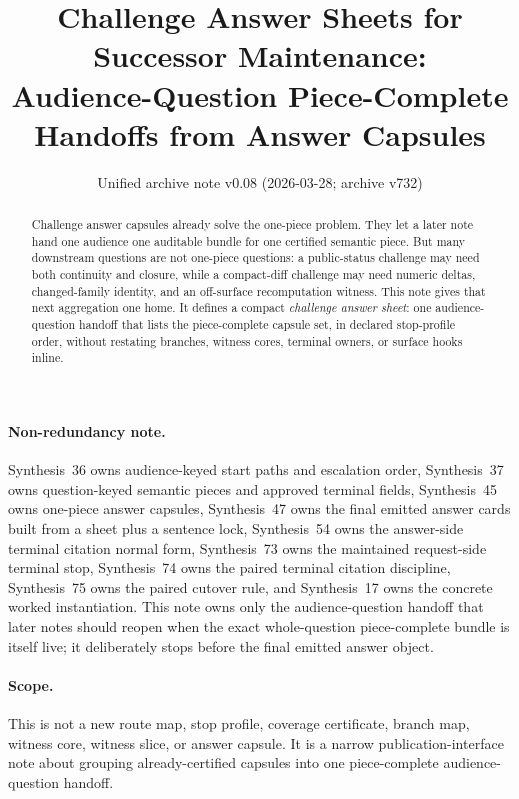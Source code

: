 \documentclass[11pt]{article}
\title{Challenge Answer Sheets for Successor Maintenance:\\[0.5ex]
\large Audience-Question Piece-Complete Handoffs from Answer Capsules}
\author{}
\date{Unified archive note v0.08 (2026-03-28; archive v732)}
\begin{document}
\maketitle

\begin{abstract}
Challenge answer capsules already solve the one-piece problem.
They let a later note hand one audience one auditable bundle for one certified semantic piece.
But many downstream questions are not one-piece questions: a public-status challenge may need both continuity and closure, while a compact-diff challenge may need numeric deltas, changed-family identity, and an off-surface recomputation witness.
This note gives that next aggregation one home.
It defines a compact \emph{challenge answer sheet}: one audience-question handoff that lists the piece-complete capsule set, in declared stop-profile order, without restating branches, witness cores, terminal owners, or surface hooks inline.
\end{abstract}

\paragraph{Non-redundancy note.}
Synthesis~36 owns audience-keyed start paths and escalation order, Synthesis~37 owns question-keyed semantic pieces and approved terminal fields, Synthesis~45 owns one-piece answer capsules, Synthesis~47 owns the final emitted answer cards built from a sheet plus a sentence lock, Synthesis~54 owns the answer-side terminal citation normal form, Synthesis~73 owns the maintained request-side terminal stop, Synthesis~74 owns the paired terminal citation discipline, Synthesis~75 owns the paired cutover rule, and Synthesis~17 owns the concrete worked instantiation.
This note owns only the audience-question handoff that later notes should reopen when the exact whole-question piece-complete bundle is itself live; it deliberately stops before the final emitted answer object.

\paragraph{Scope.}
This is not a new route map, stop profile, coverage certificate, branch map, witness core, witness slice, or answer capsule.
It is a narrow publication-interface note about grouping already-certified capsules into one piece-complete audience-question handoff.
\end{document}
